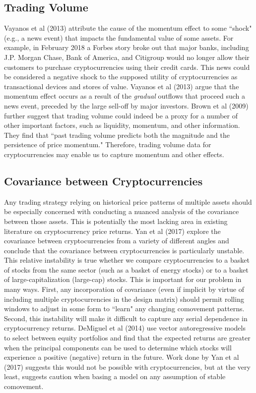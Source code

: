 \documentclass[12pt,twoside]{article}
\begin{document}
\subsection{Trading Volume}
Vayanos et al (2013) attribute the cause of the momentum effect to some ``shock" (e.g., a news event) that impacts the fundamental value of some assets. For example, in February 2018 a Forbes story broke out that major banks, including J.P. Morgan Chase, Bank of America, and Citigroup would no longer allow their customers to purchase cryptocurrencies using their credit cards. This news could be considered a negative shock to the supposed utility of cryptocurrencies as transactional devices and stores of value. Vayanos et al (2013) argue that the momentum effect occurs as a result of the \textit{gradual} outflows that proceed such a news event, preceded by the large sell-off by major investors. Brown et al (2009) further suggest that trading volume could indeed be a proxy for a number of other important factors, such as liquidity, momentum, and other information. They find that ``past trading volume predicts both the magnitude and the persistence of price momentum." Therefore, trading volume data for cryptocurrencies may enable us to capture momentum and other effects.
\subsection{Covariance between Cryptocurrencies}
Any trading strategy relying on historical price patterns of multiple assets should be especially concerned with conducting a nuanced analysis of the covariance between those assets. This is potentially the most lacking area in existing literature on cryptocurrency price returns. Yan et al (2017) explore the covariance between cryptocurrencies from a variety of different angles and conclude that the covariance between cryptocurrencies is particularly unstable. This relative instability is true whether we compare cryptocurrencies to a basket of stocks from the same sector (such as a basket of energy stocks) or to a basket of large-capitalization (large-cap) stocks. This is important for our problem in many ways. First, any incorporation of covariance (even if implicit by virtue of including multiple cryptocurrencies in the design matrix) should permit rolling windows to adjust in some form to ``learn" any changing comovement patterns. Second, this instability will make it difficult to capture any serial dependence in cryptocurrency returns. DeMiguel et al (2014) use vector autoregressive models to select between equity portfolios and find that the expected returns are greater when the principal components can be used to determine which stocks will experience a positive (negative) return in the future. Work done by Yan et al (2017) suggests this would not be possible with cryptocurrencies, but at the very least, suggests caution when basing a model on any assumption of stable comovement.
\end{document}
